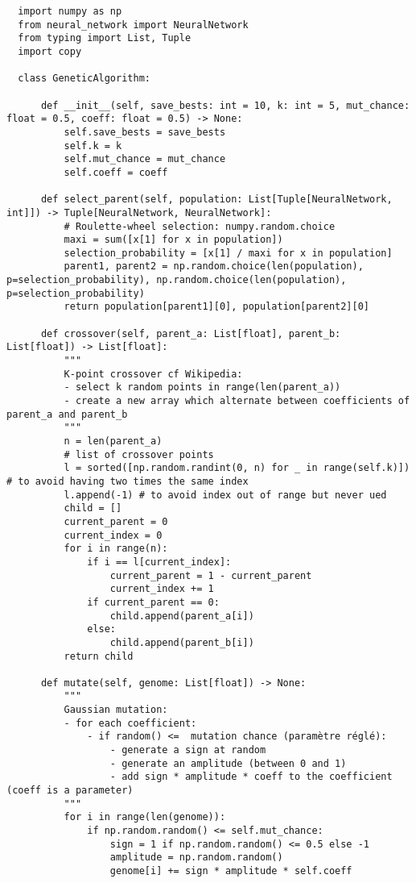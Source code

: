 \documentclass[11pt,a4paper]{article}
\begin{document}
\begin{verbatim}
  import numpy as np
  from neural_network import NeuralNetwork
  from typing import List, Tuple
  import copy
  
  class GeneticAlgorithm:
  
      def __init__(self, save_bests: int = 10, k: int = 5, mut_chance: float = 0.5, coeff: float = 0.5) -> None:
          self.save_bests = save_bests
          self.k = k
          self.mut_chance = mut_chance
          self.coeff = coeff
  
      def select_parent(self, population: List[Tuple[NeuralNetwork, int]]) -> Tuple[NeuralNetwork, NeuralNetwork]:
          # Roulette-wheel selection: numpy.random.choice
          maxi = sum([x[1] for x in population])
          selection_probability = [x[1] / maxi for x in population]
          parent1, parent2 = np.random.choice(len(population), p=selection_probability), np.random.choice(len(population), p=selection_probability)
          return population[parent1][0], population[parent2][0]
  
      def crossover(self, parent_a: List[float], parent_b: List[float]) -> List[float]:
          """
          K-point crossover cf Wikipedia:
          - select k random points in range(len(parent_a))
          - create a new array which alternate between coefficients of parent_a and parent_b
          """
          n = len(parent_a)
          # list of crossover points
          l = sorted([np.random.randint(0, n) for _ in range(self.k)]) # to avoid having two times the same index
          l.append(-1) # to avoid index out of range but never ued
          child = []
          current_parent = 0
          current_index = 0
          for i in range(n):
              if i == l[current_index]:
                  current_parent = 1 - current_parent
                  current_index += 1
              if current_parent == 0:
                  child.append(parent_a[i])
              else:
                  child.append(parent_b[i])
          return child
  
      def mutate(self, genome: List[float]) -> None:
          """
          Gaussian mutation:
          - for each coefficient:
              - if random() <=  mutation chance (paramètre réglé):
                  - generate a sign at random
                  - generate an amplitude (between 0 and 1)
                  - add sign * amplitude * coeff to the coefficient (coeff is a parameter)
          """
          for i in range(len(genome)):
              if np.random.random() <= self.mut_chance:
                  sign = 1 if np.random.random() <= 0.5 else -1
                  amplitude = np.random.random()
                  genome[i] += sign * amplitude * self.coeff
  

\end{verbatim}
\end{document}

